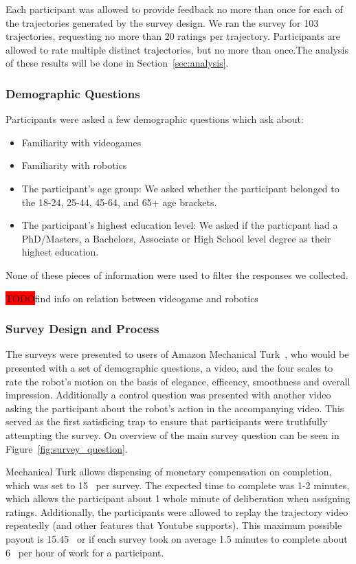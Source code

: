 \documentclass[letterpaper, 10 pt, conference]{ieeeconf}  %
\newcommand{\todo}{\colorbox{red}{TODO}}
\begin{document}
Each participant was allowed to provide feedback no more than once for each of the trajectories generated by the survey design. We ran the survey for 103 trajectories, requesting no more than 20 ratings per trajectory. Participants are allowed to rate multiple distinct trajectories, but no more than once.The analysis of these results will be done in Section~\ref{sec:analysis}.

\subsubsection{Demographic Questions}

Participants were asked a few demographic questions which ask about:

\begin{itemize}
\item Familiarity with videogames
\item Familiarity with robotics
\item The participant's age group: We asked whether the participant belonged to the 18-24, 25-44, 45-64, and 65+ age brackets.
\item The participant's highest education level: We asked if the particpant had a PhD/Masters, a Bachelors, Associate or High School level degree as their highest education.
\end{itemize}

None of these pieces of information were used to filter the responses we collected.

\todo find info on relation between videogame and robotics

\subsubsection{Survey Design and Process}

The surveys were presented to users of Amazon Mechanical Turk~\cite{paolacci2010running}, who would be presented with a set of demographic questions, a video, and the four scales to rate the robot's motion on the basis of elegance, efficency, smoothness and overall impression. Additionally a control question was presented with another video asking the participant about the robot's action in the accompanying video. This served as the first satisficing trap to ensure that participants were truthfully attempting the survey. On overview of the main survey question can be seen in Figure~\ref{fig:survey_question}.

Mechanical Turk allows dispensing of monetary compensation on completion, which was set to 15\textcent~ per survey. The expected time to complete was 1-2 minutes, which allows the participant about 1 whole minute of deliberation when assigning ratings. Additionally, the participants were allowed to replay the trajectory video repeatedly (and other features that Youtube supports). This maximum possible payout is 15.45\textdollar~ or if each survey took on average 1.5 minutes to complete about 6\textdollar~ per hour of work for a participant.
\end{document}

